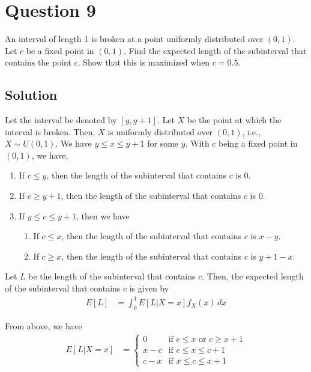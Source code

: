 \section*{Question 9}

An interval of length 1 is broken at a point uniformly distributed over \( (0,1) \).
Let \( c \) be a fixed point in \( (0,1) \).
Find the expected length of the subinterval that contains the point \( c \).
Show that this is maximized when \( c=0.5 \).

\subsection*{Solution}

Let the interval be denoted by \( [y, y+1] \).
Let \( X \) be the point at which the interval is broken.
Then, \( X \) is uniformly distributed over \( (0,1) \), i.e., \( X \sim U(0, 1) \).
We have \( y \leq x \leq y+1 \) for some \( y \).
With \( c \) being a fixed point in \( (0,1) \), we have,
\begin{enumerate}
    \item If \( c \leq y \), then the length of the subinterval that contains \( c \) is \( 0 \).
    \item If \( c \geq y+1 \), then the length of the subinterval that contains \( c \) is \( 0 \).
    \item If \( y \leq c \leq y+1 \), then we have
          \begin{enumerate}
              \item If \( c \leq x \), then the length of the subinterval that contains \( c \) is \( x-y \).
              \item If \( c \geq x \), then the length of the subinterval that contains \( c \) is \( y+1-x \).
          \end{enumerate}
\end{enumerate}

Let \( L \) be the length of the subinterval that contains \( c \).
Then, the expected length of the subinterval that contains \( c \) is given by
\begin{align*}
    E[L] & = \int_{0}^{1} E[L|X=x] f_X(x) \, dx
\end{align*}

From above, we have
\begin{align*}
    E[L|X=x]
     & =
    \begin{cases}
        0
         &
        \text{if } c \leq x \text{ or } c \geq x+1
        \\
        x-c
         &
        \text{if } c \leq x \leq c+1
        \\
        c-x
         &
        \text{if } x \leq c \leq x+1
    \end{cases}
\end{align*}

